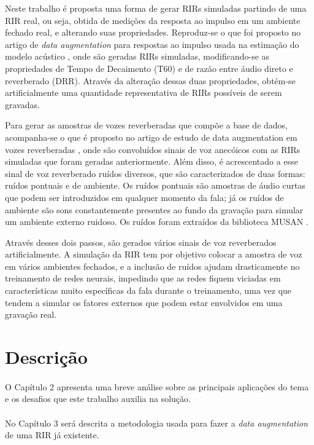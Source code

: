 Neste trabalho é proposta uma forma de gerar RIRs simuladas partindo de uma RIR real, ou seja, obtida de medições da resposta ao impulso em um ambiente
fechado real, e alterando suas propriedades. Reproduz-se o que foi proposto no artigo de \textit{data augmentation} para respostas ao impulso usada na
estimação do modelo acústico \cite{RIR_Data_Aug}, onde são geradas RIRs simuladas, modificando-se as propriedades de Tempo de Decaimento (T60) e de
razão entre áudio direto e reverberado (DRR). Através da alteração dessas duas propriedades,
obtém-se artificialmente uma quantidade representativa de RIRs possíveis de serem gravadas.

Para gerar as amostras de vozes reverberadas que compõe a base de dados, acompanha-se o que é proposto no artigo de estudo de data
augmentation em vozes reverberadas \cite{Speech_Rec}, onde são convoluídos sinais de voz anecóicos com as RIRs simuladas que foram geradas anteriormente.
Além disso, é acrescentado a esse sinal de voz reverberado ruídos diversos, que são caracterizados de duas formas: ruídos pontuais e de ambiente.
Os ruídos pontuais são amostras de áudio curtas que podem ser introduzidos em qualquer momento da fala; já os ruídos de ambiente são sons constantemente
presentes ao fundo da gravação para simular um ambiente externo ruidoso. Os ruídos foram extraídos da biblioteca MUSAN \cite{noiseLib}.

Através desses dois passos, são gerados vários sinais de voz reverberados artificialmente. A simulação da RIR tem por objetivo colocar
a amostra de voz em vários ambientes fechados, e a inclusão de ruídos ajudam drasticamente no treinamento de redes neurais, impedindo que as redes fiquem
viciadas em características muito específicas da fala durante o treinamento, uma vez que tendem a simular 
os fatores externos que podem estar envolvidos em uma gravação real.


\section{Descrição}

\paragraph{}O Capítulo 2 apresenta uma breve análise sobre as principais aplicações do tema e os desafios que este trabalho auxilia na solução.

\paragraph{}No Capítulo 3 será descrita a metodologia usada para fazer a \textit{data augmentation} de uma RIR já existente.


